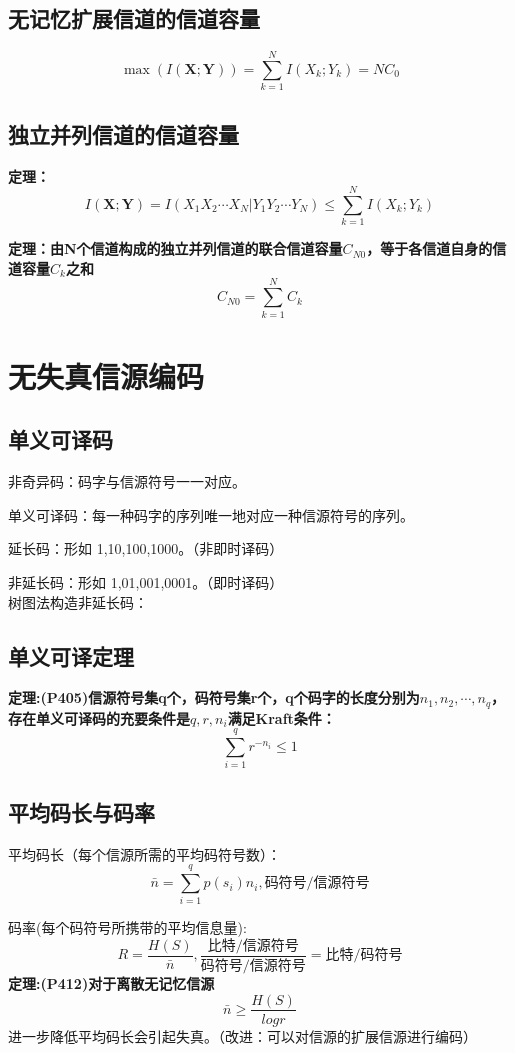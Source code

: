 \documentclass[UTF8]{ctexart} %
\begin{document}
		\subsection{无记忆扩展信道的信道容量}	
			\[\max(I(\bm{X;Y}))=\sum_{k=1}^{N}I(X_k;Y_k)=NC_0\]
			
		\subsection{独立并列信道的信道容量}	
			\textbf{定理：}
			\[I(\bm{X;Y}) = I(X_1X_2\cdots X_N|Y_1Y_2\cdots Y_N)\leq\sum_{k=1}^{N}I(X_k;Y_k)\]
			
			\textbf{定理：由N个信道构成的独立并列信道的联合信道容量$C_{N0}$，等于各信道自身的信道容量$C_k$之和}
			\[C_{N0} = \sum_{k=1}^NC_k\]
		\section{无失真信源编码}
			\subsection{单义可译码}
				非奇异码：码字与信源符号一一对应。
				
				单义可译码：每一种码字的序列唯一地对应一种信源符号的序列。
				
				延长码：形如 1,10,100,1000。（非即时译码）
				
				非延长码：形如 1,01,001,0001。（即时译码）\\
				
				树图法构造非延长码：
			\subsection{单义可译定理}
				\textbf{定理:(P405)信源符号集q个，码符号集r个，q个码字的长度分别为$n_1,n_2,\cdots,n_q$，存在单义可译码的充要条件是$q,r,n_i$满足Kraft条件：}
					\[\sum_{i=1}^qr^{-n_i}\leq1\]	
			\subsection{平均码长与码率}
				平均码长（每个信源所需的平均码符号数）：
				\[\bar{n}=\sum_{i=1}^qp(s_i)n_i,\text{码符号/信源符号}\]
				
				码率(每个码符号所携带的平均信息量):
				\[R=\frac{H(S)}{\bar{n}},\frac{\text{比特/信源符号}}{\text{码符号/信源符号}}=\text{比特/码符号}\]
				\textbf{定理:(P412)对于离散无记忆信源}
				\[\bar{n}\geq\frac{H(S)}{logr}\]
				进一步降低平均码长会引起失真。（改进：可以对信源的扩展信源进行编码）
				
\end{document}
